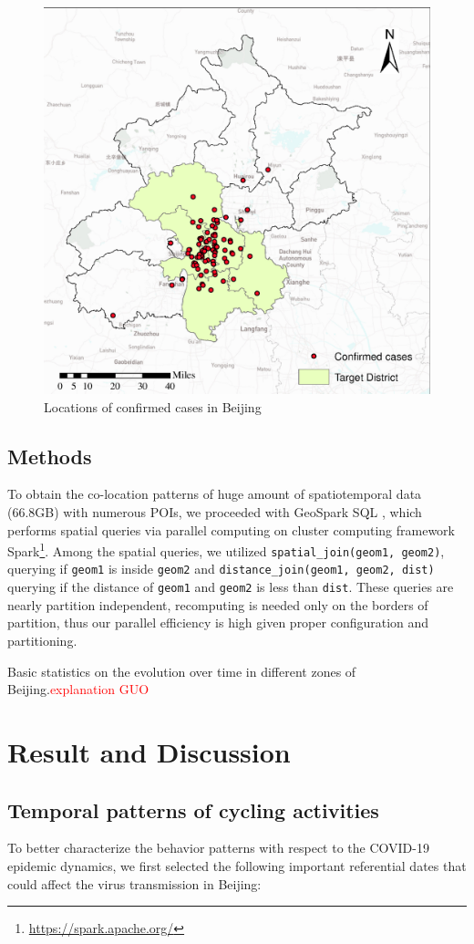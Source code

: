 \documentclass[preprints,ijgi,submit,moreauthors]{Definitions/mdpi}
\begin{document}
\begin{figure}[H]
    \centering
    \includegraphics[width=.5\textwidth]{Figures/Plot_location_confirmed_cases.eps}
    \caption{Locations of confirmed cases in Beijing}
    \label{fig:locations_of_confirmed_cases}
\end{figure} 

\subsection{Methods}
To obtain the co-location patterns of huge amount of spatiotemporal data (66.8GB) with numerous POIs, we proceeded with GeoSpark SQL \cite{huang2017geospark}, which performs spatial queries via parallel computing on cluster computing framework Spark\footnote{\url{https://spark.apache.org/}}.
Among the spatial queries, we utilized \texttt{spatial\_join(geom1, geom2)}, querying if \texttt{geom1} is inside \texttt{geom2} and \texttt{distance\_join(geom1, geom2, dist)} querying if the distance of \texttt{geom1} and \texttt{geom2} is less than \texttt{dist}.
These queries are nearly partition independent, recomputing is needed only on the borders of partition, thus our parallel efficiency is high given proper configuration and partitioning.

Basic statistics on the evolution over time in different zones of Beijing.\textcolor{red}{explanation GUO} 

\section{Result and Discussion}

\subsection{Temporal patterns of cycling activities}
To better characterize the behavior patterns with respect to the COVID-19 epidemic dynamics, we first selected the following important referential dates that could affect the virus transmission in Beijing: 
\end{document}
